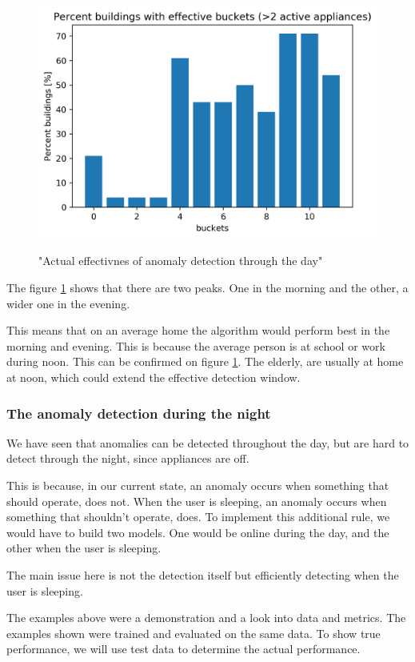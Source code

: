 \begin{figure}[H]
	\centering
	\caption{"Actual effectivnes of anomaly detection through the day"}
	\includegraphics[width=.8\textwidth]{Figures/EC/all_ignored_buckets_dist_incl_act.png}
	\label{fig:ignored_buckets_act}
\end{figure}

The figure \ref{fig:ignored_buckets_act} shows that there are two peaks.
One in the morning and the other, a wider one in the evening.

This means that on an average home the algorithm would perform best in the morning and evening.
This is because the average person is at school or work during noon. 
This can be confirmed on figure \ref{fig:ignored_buckets_act}.
The elderly, are usually at home at noon, which could extend the effective detection window.


\subsubsection{The anomaly detection during the night}

We have seen that anomalies can be detected throughout the day,
but are hard to detect through the night, since appliances are off.

This is because, in our current state, an anomaly occurs when something that should operate, does not.
When the user is sleeping, an anomaly occurs when something that shouldn't operate, does. 
To implement this additional rule, we would have to build two models.
One would be online during the day, and the other when the user is sleeping.

The main issue here is not the detection itself but efficiently detecting
when the user is sleeping. 

The examples above were a demonstration and a look into data and metrics. 
The examples shown were trained and evaluated on the same data. 
To show true performance, we will use test data to determine the actual performance. 

